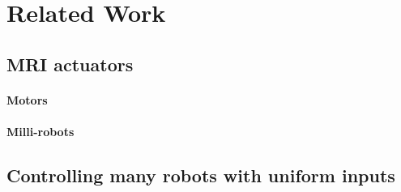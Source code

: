 

\section{Related Work}\label{sec:RelatedWork}


\subsection{MRI actuators}

\paragraph{Motors}

\paragraph{Milli-robots}


\subsection{Controlling many robots with uniform inputs}